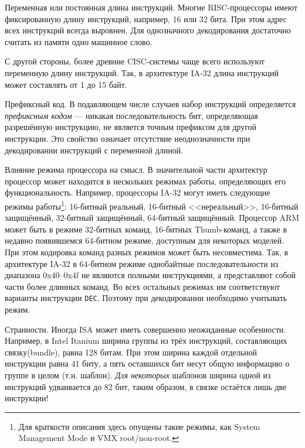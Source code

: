\begin{description*}
    \item[Переменная или постоянная длина инструкций.] Многие RISC-процессоры имеют фиксированную длину инструкций, например, 16 или 32 бита. При этом адрес всех инструкций всегда выровнен. Для однозначного декодирования достаточно считать из памяти одно машинное слово.
    
    С другой стороны, более древние CISC-системы чаще всего используют переменную длину инструкций. Так, в архитектуре IA-32 длина инструкций может составлять от 1 до 15 байт. %
    \item[Префиксный код.] В подавляющем числе случаев набор инструкций определяется \textit{префиксным кодом} --- никакая последовательность бит, определяющая разрешённую инструкцию, не является точным префиксом для другой инструкции. Это свойство означает  отсутствие неоднозначности при декодировании инструкций с переменной длиной. 
    \item[Влияние режима процессора на смысл.] В значительной части архитектур процессор может находится в нескольких режимах работы, определяющих его функциональность. Например, процессоры IA-32 могут иметь следующие режимы работы\footnote{Для краткости описания здесь опущены такие режимы, как System Management Mode и VMX root/non-root.}: 16-битный реальный, 16-битный <<нереальный>>,  16-битный защищённый, 32-битный защищённый, 64-битный защищённый. Процессор ARM может быть в режиме 32-битных команд, 16-битных Thumb-команд, а также в недавно появившемся 64-битном режиме, доступным для некоторых моделей. При этом кодировка команд разных режимов может быть несовместима. Так, в архитектуре IA-32 в 64-битном режиме однобайтные последовательности из диапазона 0x40--0x4f не являются полными инструкциями, а представляют собой части более длинных команд. Во всех остальных режимах им соответствуют варианты инструкции \texttt{DEC}. Поэтому при декодировании необходимо учитывать режим.
    
    \item[Странности.] Иногда ISA может иметь совершенно неожиданные особенности. Например, в Intel Itanium ширина группы из трёх инструкций, составляющих связку(\abbr bundle), равна 128 битам. При этом ширина каждой отдельной инструкции равна 41 биту, а пять оставшихся бит несут общую информацию о группе в целом (т.н. шаблон). \textit{Для некоторых} шаблонов ширина одной из инструкций удваивается до 82 бит, таким образом, в связке остаётся лишь две инструкции!
\end{description*}

